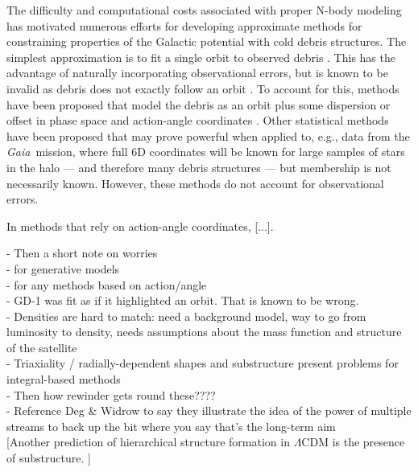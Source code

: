 \documentclass[letterpaper,12pt,preprint]{aastex}
\newcommand{\project}[1]{\textsl{#1}}
\newcommand{\gaia}{\project{Gaia}~}
\begin{document}
The difficulty and computational costs associated with proper N-body modeling has motivated numerous efforts for developing approximate methods for constraining properties of the Galactic potential with cold debris structures. The simplest approximation is to fit a single orbit to observed debris \citep[e.g.,][]{koposov10, deg13}. This has the advantage of naturally incorporating observational errors, but is known to be invalid as debris does not exactly follow an orbit \citep[e.g.,][]{binney08, eyre11, sanders13a}. To account for this, methods have been proposed that model the debris as an orbit plus some dispersion or offset in phase space \citep[e.g.,][]{eyre09a, varghese11, kuepper12} and action-angle coordinates \citep{eyre11, sanders13b, bovy14}. Other statistical methods have been proposed \citep[][]{penarrubia12, sanderson14} that may prove powerful when applied to, e.g., data from the \gaia mission, where full 6D coordinates will be known for large samples of stars in the halo --- and therefore many debris structures --- but membership is not necessarily known. However, these methods do not account for observational errors.

In methods that rely on action-angle coordinates, [...].

- Then a short note on worries\\
\indent\indent- for generative models\\
\indent\indent- for any methods based on action/angle \\
\indent\indent- GD-1 was fit as if it highlighted an orbit.  That is known to be wrong.\\
\indent\indent- Densities are hard to match: need a background model, way to go from luminosity to density, needs assumptions about the mass function and structure of the satellite\\
\indent\indent- Triaxiality / radially-dependent shapes and substructure present problems for integral-based methods\\
- Then how rewinder gets round these????\\
\indent\indent- Reference Deg \& Widrow to say they illustrate the idea of the power of multiple streams to back up the bit where you say that's the long-term aim\\

[Another prediction of hierarchical structure formation in $\Lambda$CDM is the presence of substructure. ]

\end{document}
